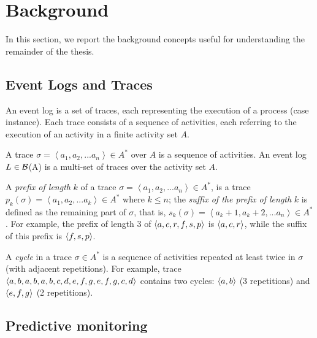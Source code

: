 

\section{Background} %
\label{sec:background}
In this section, we report the background concepts useful for understanding the remainder of the thesis.



\subsection{Event Logs and Traces}
An event log is a set of traces, each representing the execution of a process (case instance). Each trace consists of a sequence of activities, each referring to the execution of an activity in a finite activity set $A$.
\begin{definition}
	A trace $\sigma=\left\langle a_1, a_2, ... a_n\right\rangle \in A^*$ over $A$ is a sequence of activities. An event log $L \in \cal{B}$(A) is a multi-set of traces over the activity set $A$.
\end{definition}

A \emph{prefix of length} $k$ of a trace $\sigma=\left\langle a_1, a_2, ... a_n\right\rangle \in A^*$, is a trace $p_k(\sigma)=\left\langle a_1, a_2, ... a_k\right\rangle \in A^*$ where $k \leq n$; the \emph{suffix of the prefix of length} $k$ is defined as the remaining part of $\sigma$, that is, $s_k(\sigma) = \left\langle a_k+1, a_k+2, ... a_n\right\rangle \in A^*$. For example, the prefix of length $3$ of $\langle a,c,r,f,s,p\rangle$ is $\langle a,c,r\rangle$, while the suffix of this prefix is $\langle f,s,p\rangle$.

A \emph{cycle} in a trace $\sigma \in A^*$ is a sequence of activities repeated at least twice in $\sigma$ (with adjacent repetitions). For example, trace $\langle a,b,a,b,a,b,c,d,e,f,g,e,f,g,c,d\rangle$ contains two cycles: $\langle a,b\rangle$ (3 repetitions) and $\langle e,f,g\rangle$ (2 repetitions).



\subsection{Predictive monitoring}


